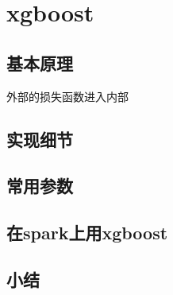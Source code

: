 \chapter{xgboost}

\section{基本原理}
外部的损失函数进入内部

\section{实现细节}

\section{常用参数}

\section{在spark上用xgboost}

\section{小结}
